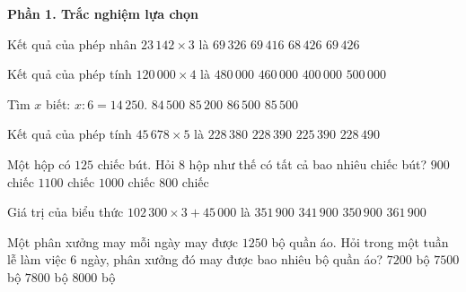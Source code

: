 \textbf{Phần 1. Trắc nghiệm lựa chọn}

\begin{ex} %
Kết quả của phép nhân $23\,142 \times 3$ là
\choice
{$69\,326$}
{$69\,416$}
{$68\,426$}
{\True $69\,426$}
\end{ex}

\begin{ex} %
Kết quả của phép tính $120\,000 \times 4$ là
\choice
{\True $480\,000$}
{$460\,000$}
{$400\,000$}
{$500\,000$}
\end{ex}

\begin{ex} %
Tìm $x$ biết: $x : 6 = 14\,250$.
\choice
{$84\,500$}
{$85\,200$}
{$86\,500$}
{\True $85\,500$}
\end{ex}

\begin{ex} %
Kết quả của phép tính $45\,678 \times 5$ là
\choice
{$228\,380$}
{\True $228\,390$}
{$225\,390$}
{$228\,490$}
\end{ex}

\begin{ex} %
Một hộp có $125$ chiếc bút. Hỏi $8$ hộp như thế có tất cả bao nhiêu chiếc bút?
\choice
{$900$ chiếc}
{$1100$ chiếc}
{\True $1000$ chiếc}
{$800$ chiếc}
\end{ex}

\begin{ex} %
Giá trị của biểu thức $102\,300 \times 3 + 45\,000$ là
\choice
{\True $351\,900$}
{$341\,900$}
{$350\,900$}
{$361\,900$}
\end{ex}

\begin{ex} %
Một phân xưởng may mỗi ngày may được $1250$ bộ quần áo. Hỏi trong một tuần lễ làm việc 6 ngày, phân xưởng đó may được bao nhiêu bộ quần áo?
\choice
{$7200$ bộ}
{\True $7500$ bộ}
{$7800$ bộ}
{$8000$ bộ}
\end{ex}


